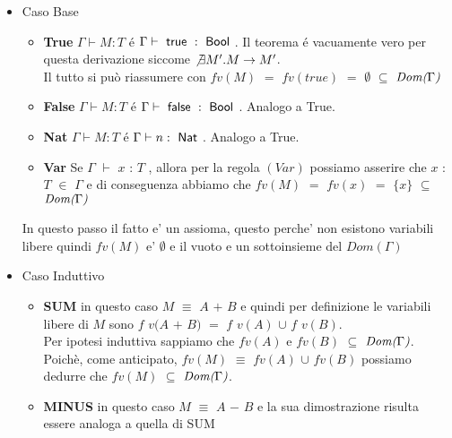\begin{itemize}


\item Caso Base 
		\begin{itemize}[label=$\star$]

		\item \textbf{True}  $\Gamma \vdash{} M : T$ \'e $\Gamma \vdash{} \true{} : \Bool$.
  		Il teorema \'e vacuamente vero per questa derivazione siccome $\not \exists{M'}. M \to{} M'$.\\
  		Il tutto si pu\`o riassumere con $fv(M)$ $=$ $fv(true)$ $=$ $\emptyset$ $\subseteq$ $\emph{Dom(}\Gamma\emph{)}$

  
 		\item \textbf{False} $\Gamma \vdash{} M : T$ \'e $\Gamma \vdash{} \false{} : \Bool$. Analogo a True.

		\item \textbf{Nat} $\Gamma \vdash{} M : T$ \'e $\Gamma \vdash{} n : \Nat$. Analogo a True.

		\item \textbf{Var}  Se $\Gamma$ $\vdash$ $x$ : $T$ , allora per la regola $(Var)$ possiamo asserire che $x$ : $T$ $\in$ $\Gamma$ e di conseguenza abbiamo che  $fv(M)$ $=$ $fv(x)$ $=$ $\{x\}$ $\subseteq$ $\emph{Dom(}\Gamma\emph{)}$

  
		\end{itemize}
		In questo passo il fatto e' un assioma, questo perche' non esistono variabili libere quindi $fv(M)$ e' $\emptyset$ e il vuoto e un sottoinsieme del $Dom(\Gamma)$

\item Caso Induttivo
		
		\begin{itemize}[label=$\star$]

		\item \textbf{SUM}  in questo caso $M$ $\equiv$ $A$ $+$ $B$ e quindi per definizione le variabili libere di $M$ sono $f$ $v(A$ $+$ $B)$ $=$ $f$ $v(A)$ $\cup$ $f$ $v(B)$.\\ Per ipotesi induttiva sappiamo che $fv(A)$ e $fv(B)$ $\subseteq$ $\emph{Dom(}\Gamma\emph{)}$.\\Poich\`e, come anticipato, $fv(M)$ $\equiv$ $fv(A)$ $\cup$ $fv(B)$ possiamo dedurre che $fv(M)$ $\subseteq$ $\emph{Dom(}\Gamma\emph{)}$.
  		
  
 		\item \textbf{MINUS} in questo caso $M$ $\equiv$ $A$ $-$ $B$ e la sua dimostrazione risulta essere analoga a quella di SUM


\end{itemize}
\end{itemize}
